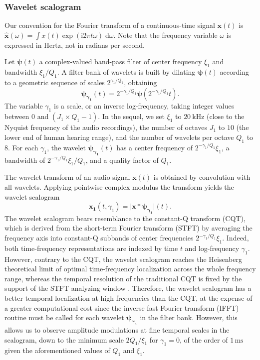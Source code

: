 \subsubsection{Wavelet scalogram}

Our convention for the Fourier transform of a continuous-time signal $\boldsymbol{x}(t)$ is $\boldsymbol{\hat{x}}(\omega) = \int x(t) \exp(\mathrm{i} 2\pi t \omega) \; \mathrm{d}\omega$. Note that the frequency variable $\omega$ is expressed in Hertz, not in radians per second.

Let $\boldsymbol{\psi}(t)$ a complex-valued band-pass filter of
center frequency $\xi_1$ and bandwidth $\xi_1/Q_1$.
A filter bank of wavelets is built by dilating $\boldsymbol{\psi}(t)$
according to a geometric sequence of scales $2^{\gamma_1/Q_1}$, obtaining
\begin{equation}
\boldsymbol{\psi_{\gamma_1}}(t) = 2^{-\gamma_1/Q_1} \boldsymbol{\psi}(2^{-\gamma_1/Q_1} t)\mbox{.}
\end{equation}
The variable $\gamma_1$ is a scale, or an inverse log-frequency, taking integer values between $0$ and $(J_1 \times Q_1 - 1)$.
In the sequel, we set $\xi_1$ to $20~\mathrm{kHz}$ (close to the Nyquist frequency of the audio recordings), the number of octaves $J_1$ to $10$ (the lower end of human hearing range), and the number of wavelets per octave $Q_1$ to $8$.
For each $\gamma_1$, the wavelet $\boldsymbol{\psi_{\gamma_1}}(t)$
has a center frequency of $2^{-\gamma_1/Q_1}\xi_1$, a bandwidth of $2^{-\gamma_1/Q_1}\xi_1/Q_1$, and a quality factor of $Q_1$.

The wavelet transform of an audio signal
$\boldsymbol{x}(t)$ is obtained by convolution with all wavelets.
Applying pointwise complex modulus the transform yields
the wavelet scalogram
\begin{equation}
\boldsymbol{x_1}(t, \gamma_1)
= \vert \boldsymbol{x} \ast \boldsymbol{\psi_{\gamma_1}} \vert (t)\mbox{.}
\end{equation}
The wavelet scalogram bears resemblance to the constant-Q transform (CQT),
which is derived from the short-term Fourier transform (STFT) by averaging the frequency
axis into constant-Q subbands of center frequencies $2^{-\gamma_1/Q_1}\xi_1$.
Indeed, both time-frequency representations are indexed by time $t$ and log-frequency $\gamma_1$.
However, contrary to the CQT, the wavelet scalogram reaches the Heisenberg
theoretical limit of optimal time-frequency localization across the whole
frequency range, whereas the temporal resolution of the traditional CQT is fixed by the support of the STFT analyzing window \cite{Brown1992}.
Therefore, the wavelet scalogram has a better temporal localization at high
frequencies than the CQT, at the expense of a greater computational cost
since the inverse fast Fourier transform (IFFT) routine must be called for each wavelet $\boldsymbol{\psi_{\gamma_1}}$ in the filter bank.
However, this allows us to observe amplitude modulations at fine temporal scales in the scalogram, down to the minimum scale $2Q_1/\xi_1$ for $\gamma_1 = 0$, of the order of $1\,\textrm{ms}$ given the aforementioned values of $Q_1$ and $\xi_1$.

